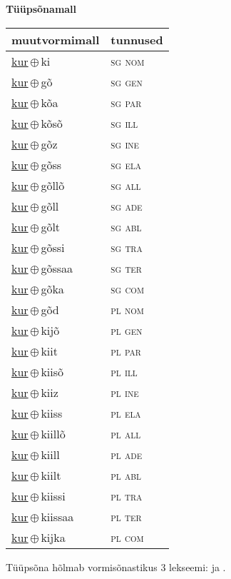 

\vspace{3.5em}
\noindent \begin{minipage}{\textwidth}
\noindent \textbf{Tüüpsõnamall \,}\\

\begin{sideways}
\begin{tabular}{l l}
muutvormimall & tunnused \\
\hline
\underline{kur}\,$\oplus$\,ki & \textsc{ sg nom } \\
\underline{kur}\,$\oplus$\,gõ & \textsc{ sg gen } \\
\underline{kur}\,$\oplus$\,kõa & \textsc{ sg par } \\
\underline{kur}\,$\oplus$\,kõsõ & \textsc{ sg ill } \\
\underline{kur}\,$\oplus$\,gõz & \textsc{ sg ine } \\
\underline{kur}\,$\oplus$\,gõss & \textsc{ sg ela } \\
\underline{kur}\,$\oplus$\,gõllõ & \textsc{ sg all } \\
\underline{kur}\,$\oplus$\,gõll & \textsc{ sg ade } \\
\underline{kur}\,$\oplus$\,gõlt & \textsc{ sg abl } \\
\underline{kur}\,$\oplus$\,gõssi & \textsc{ sg tra } \\
\underline{kur}\,$\oplus$\,gõssaa & \textsc{ sg ter } \\
\underline{kur}\,$\oplus$\,gõka & \textsc{ sg com } \\
\underline{kur}\,$\oplus$\,gõd & \textsc{ pl nom } \\
\underline{kur}\,$\oplus$\,kijõ & \textsc{ pl gen } \\
\underline{kur}\,$\oplus$\,kiit & \textsc{ pl par } \\
\underline{kur}\,$\oplus$\,kiisõ & \textsc{ pl ill } \\
\underline{kur}\,$\oplus$\,kiiz & \textsc{ pl ine } \\
\underline{kur}\,$\oplus$\,kiiss & \textsc{ pl ela } \\
\underline{kur}\,$\oplus$\,kiillõ & \textsc{ pl all } \\
\underline{kur}\,$\oplus$\,kiill & \textsc{ pl ade } \\
\underline{kur}\,$\oplus$\,kiilt & \textsc{ pl abl } \\
\underline{kur}\,$\oplus$\,kiissi & \textsc{ pl tra } \\
\underline{kur}\,$\oplus$\,kiissaa & \textsc{ pl ter } \\
\underline{kur}\,$\oplus$\,kijka & \textsc{ pl com } \\
\end{tabular}
\end{sideways}
\label{tab:tüüpsõnamall-kurki}

\end{minipage}

 
\vspace{1em}
\noindent Tüüpsõna hõlmab vormisõnastikus 3 lekseemi:  ja .
